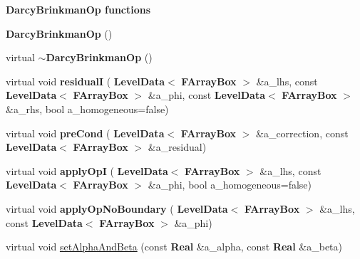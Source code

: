 \begin{Indent}\textbf{ Darcy\+Brinkman\+Op functions}\par
\begin{DoxyCompactItemize}
\item 
\mbox{\label{class_darcy_brinkman_op_a6cd24f28d1df8726929ae287490b9a3c}} 
{\bfseries Darcy\+Brinkman\+Op} ()
\item 
\mbox{\label{class_darcy_brinkman_op_a944fdaaac1b4d62baad0d5ecd148891f}} 
virtual {\bfseries $\sim$\+Darcy\+Brinkman\+Op} ()
\item 
\mbox{\label{class_darcy_brinkman_op_a9bacaab9278b52f297ba8ef6fdd438a4}} 
virtual void {\bfseries residualI} (\textbf{ Level\+Data}$<$ \textbf{ F\+Array\+Box} $>$ \&a\+\_\+lhs, const \textbf{ Level\+Data}$<$ \textbf{ F\+Array\+Box} $>$ \&a\+\_\+phi, const \textbf{ Level\+Data}$<$ \textbf{ F\+Array\+Box} $>$ \&a\+\_\+rhs, bool a\+\_\+homogeneous=false)
\item 
\mbox{\label{class_darcy_brinkman_op_af6eb3662000de656241b272ca947ff53}} 
virtual void {\bfseries pre\+Cond} (\textbf{ Level\+Data}$<$ \textbf{ F\+Array\+Box} $>$ \&a\+\_\+correction, const \textbf{ Level\+Data}$<$ \textbf{ F\+Array\+Box} $>$ \&a\+\_\+residual)
\item 
\mbox{\label{class_darcy_brinkman_op_ab844b37881daf983c00080b9cb4da099}} 
virtual void {\bfseries apply\+OpI} (\textbf{ Level\+Data}$<$ \textbf{ F\+Array\+Box} $>$ \&a\+\_\+lhs, const \textbf{ Level\+Data}$<$ \textbf{ F\+Array\+Box} $>$ \&a\+\_\+phi, bool a\+\_\+homogeneous=false)
\item 
\mbox{\label{class_darcy_brinkman_op_aa7c0a826f1109c621a7ce43efb915c5e}} 
virtual void {\bfseries apply\+Op\+No\+Boundary} (\textbf{ Level\+Data}$<$ \textbf{ F\+Array\+Box} $>$ \&a\+\_\+lhs, const \textbf{ Level\+Data}$<$ \textbf{ F\+Array\+Box} $>$ \&a\+\_\+phi)
\item 
\mbox{\label{class_darcy_brinkman_op_ac2879982d9153c9e83b1e86c2a19caa7}} 
virtual void \hyperlink{class_darcy_brinkman_op_ac2879982d9153c9e83b1e86c2a19caa7}{set\+Alpha\+And\+Beta} (const \textbf{ Real} \&a\+\_\+alpha, const \textbf{ Real} \&a\+\_\+beta)

\end{DoxyCompactItemize}
\end{Indent}
